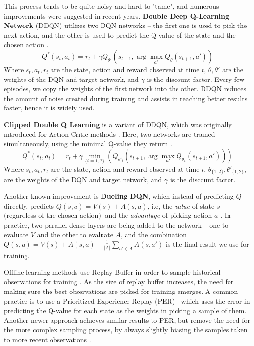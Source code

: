 \documentclass{article}
\begin{document}
\begin{multicols}{2}
This process tends to be quite noisy and hard to "tame", and numerous improvements were suggested in recent years. \textbf{Double Deep Q-Learning Network} (DDQN) utilizes two DQN networks -- the first one is used to pick the next action, and the other is used to predict the Q-value of the state and the chosen action \cite{DDQN}. 
$$Q^*(s_t, a_t) = r_t + \gamma Q_{\theta'}(s_{t+1}, \arg \max_{a'}Q_{\theta}(s_{t+1}, a'))$$
Where $s_t, a_t, r_t$ are the state, action and reward observed at time $t$, $\theta, \theta'$ are the weights of the DQN and target network, and $\gamma$ is the discount factor.
Every few episodes, we copy the weights of the first network into the other. DDQN reduces the amount of noise created during training and assists in reaching better results faster, hence it is widely used.

\textbf{Clipped Double Q Learning} is a variant of DDQN, which was originally introduced for Action-Critic methods \cite{ClippedDQN}. Here, two networks are trained simultaneously, using the minimal Q-value they return \cite{ren2021on}. 
$$Q^*(s_t, a_t) = r_t + \gamma \min_{\{i = 1, 2\}} (Q_{\theta'_i}(s_{t+1}, \arg \max_{a'}Q_{\theta_1}(s_{t+1}, a')))$$
Where $s_t, a_t, r_t$ are the state, action and reward observed at time $t$, $\theta_{\{1,2\}},  \theta'_{\{1,2\}},$ are the weights of the DQN and target network, and $\gamma$ is the discount factor.

Another known improvement is \textbf{Dueling DQN}, which instead of predicting $Q$ directly, predicts $Q(s,a)=V(s)+A(s,a)$, i.e, the \textit{value} of state $s$ (regardless of the chosen action), and the \textit{advantage} of picking action $a$ \cite{DuelingDQN}. In practice, two parallel dense layers are being added to the network -- one to evaluate $V$ and the other to evaluate $A$, and the combination $Q(s,a)=V(s)+A(s,a) - \frac1{|A|}\sum_{a'\in A}A(s,a')$ is the final result we use for training.

Offline learning methods use Replay Buffer in order to sample historical observations for training \cite{DQN}. As the size of replay buffer increases, the need for making sure the best observations are picked for training emerges. A common practice is to use a Prioritized Experience Replay (PER) \cite{PER}, which uses the error in predicting the Q-value for each state as the weights in picking a sample of them. Another newer approach achieves similar results to PER, but remove the need for the more complex sampling process, by always slightly biasing the samples taken to more recent observations \cite{ExpReplay}.


\end{multicols}
\end{document}
